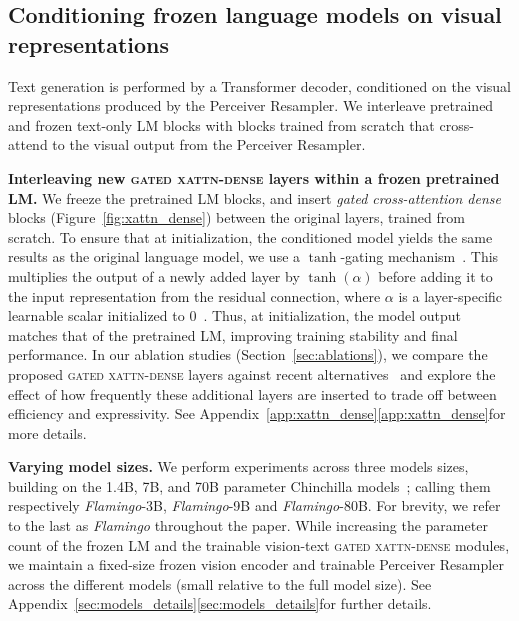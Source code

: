 \subsection{Conditioning frozen language models on visual representations}
\label{sec:xattn_dense}

Text generation is performed by a Transformer decoder, conditioned on the visual representations produced by the Perceiver Resampler. We interleave pretrained and frozen text-only LM blocks with blocks trained from scratch that cross-attend to the visual output from the Perceiver Resampler.

\textbf{Interleaving new \textsc{gated xattn-dense} layers within a frozen pretrained LM.} We freeze the pretrained LM blocks, and insert \textit{gated cross-attention dense} blocks (Figure~\ref{fig:xattn_dense}) between the original layers, trained from scratch. To ensure that at initialization, the conditioned model yields the same results as the original language model, we use a $\tanh$-gating mechanism~\citep{hochreiter1997long}. This multiplies the output of a newly added layer by $\tanh(\alpha)$ before adding it to the input representation from the residual connection, where $\alpha$ is a layer-specific learnable scalar initialized to $0$~\cite{bachlechner2021rezero}. Thus, at initialization, the model output matches that of the pretrained LM, improving training stability and final performance. In our ablation studies (Section~\ref{sec:ablations}), we compare the proposed \textsc{gated xattn-dense} layers against recent alternatives~\citep{desai2021virtex,luo2022vc} and explore the effect of how frequently these additional layers are inserted to trade off between efficiency and expressivity. See Appendix~\ifwithappendix\ref{app:xattn_dense}\else\ref*{app:xattn_dense}\fi for more details.

\textbf{Varying model sizes.} We perform experiments across three models sizes, building on the 1.4B, 7B, and 70B parameter Chinchilla models~\citep{chinchilla}; calling them respectively \emph{Flamingo}-3B, \emph{Flamingo}-9B and \emph{Flamingo}-80B.
For brevity, we refer to the last as \emph{Flamingo} throughout the paper. While increasing the parameter count of the frozen LM and the trainable vision-text \textsc{gated xattn-dense} modules, we maintain a fixed-size frozen vision encoder and trainable Perceiver Resampler across the different models (small relative to the full model size). See Appendix~\ifwithappendix\ref{sec:models_details}\else\ref*{sec:models_details}\fi for further details.

